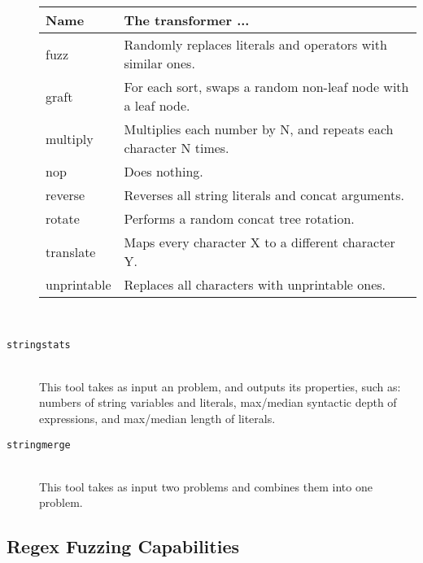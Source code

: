 \begin{description}
            \begin{tabular}{|l|l|}
                \hline
                \textbf{Name} & \textbf{The transformer ...} \\ \hline
                fuzz          & Randomly replaces literals and operators with similar ones. \\ \hline
                graft         & For each sort, swaps a random non-leaf node with a leaf node. \\ \hline
                multiply      & Multiplies each number by N, and repeats each character N times. \\ \hline
                nop           & Does nothing. \\ \hline
                reverse       & Reverses all string literals and concat arguments. \\ \hline
                rotate        & Performs a random concat tree rotation. \\ \hline
                translate     & Maps every character X to a different character Y. \\ \hline
                unprintable   & Replaces all characters with unprintable ones. \\ \hline
            \end{tabular}

            \hfill \\

        \item[\texttt{stringstats}] \hfill \\
            This tool takes as input an \smt{} problem, and outputs its properties, such as: numbers of string variables and literals, max/median syntactic depth of expressions, and max/median length of literals.

            \hfill

        \item[\texttt{stringmerge}] \hfill \\
            This tool takes as input two \smt{} problems and combines them into one problem.


    \end{description}

    \subsection{Regex Fuzzing Capabilities}

